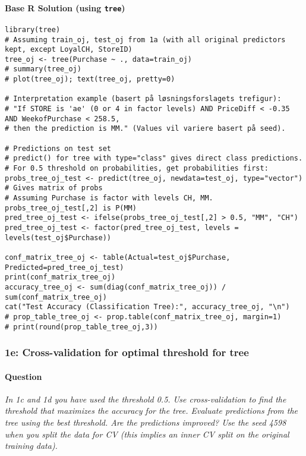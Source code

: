 \documentclass[12pt,a4paper]{article}
\newcommand{\Rpackage}[1]{\texttt{#1}} %
\begin{document}
        \paragraph{Base R Solution (using \Rpackage{tree})}
\begin{lstlisting}[]
library(tree)
# Assuming train_oj, test_oj from 1a (with all original predictors kept, except LoyalCH, StoreID)
tree_oj <- tree(Purchase ~ ., data=train_oj)
# summary(tree_oj)
# plot(tree_oj); text(tree_oj, pretty=0)

# Interpretation example (basert på løsningsforslagets trefigur):
# "If STORE is 'ae' (0 or 4 in factor levels) AND PriceDiff < -0.35 AND WeekofPurchase < 258.5,
# then the prediction is MM." (Values vil variere basert på seed).

# Predictions on test set
# predict() for tree with type="class" gives direct class predictions.
# For 0.5 threshold on probabilities, get probabilities first:
probs_tree_oj_test <- predict(tree_oj, newdata=test_oj, type="vector") # Gives matrix of probs
# Assuming Purchase is factor with levels CH, MM. probs_tree_oj_test[,2] is P(MM)
pred_tree_oj_test <- ifelse(probs_tree_oj_test[,2] > 0.5, "MM", "CH") 
pred_tree_oj_test <- factor(pred_tree_oj_test, levels = levels(test_oj$Purchase))

conf_matrix_tree_oj <- table(Actual=test_oj$Purchase, Predicted=pred_tree_oj_test)
print(conf_matrix_tree_oj)
accuracy_tree_oj <- sum(diag(conf_matrix_tree_oj)) / sum(conf_matrix_tree_oj)
cat("Test Accuracy (Classification Tree):", accuracy_tree_oj, "\n")
# prop_table_tree_oj <- prop.table(conf_matrix_tree_oj, margin=1)
# print(round(prop_table_tree_oj,3))
\end{lstlisting}

    \subsubsection{1e: Cross-validation for optimal threshold for tree}
        \paragraph{Question}
        \textit{In 1c and 1d you have used the threshold 0.5. Use cross-validation to find the threshold that maximizes the accuracy for the tree. Evaluate predictions from the tree using the best threshold. Are the predictions improved? Use the seed 4598 when you split the data for CV (this implies an inner CV split on the original training data).}
\end{document}
